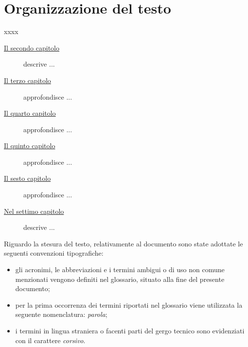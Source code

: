 \section{Organizzazione del testo}
xxxx
\begin{description}

    \item[{\hyperref[cap:processi-metodologie]{Il secondo capitolo}}] descrive ...
    
    \item[{\hyperref[cap:descrizione-stage]{Il terzo capitolo}}] approfondisce ...
    
    \item[{\hyperref[cap:analisi-requisiti]{Il quarto capitolo}}] approfondisce ...
    
    \item[{\hyperref[cap:progettazione-codifica]{Il quinto capitolo}}] approfondisce ...
    
    \item[{\hyperref[cap:verifica-validazione]{Il sesto capitolo}}] approfondisce ...
    
    \item[{\hyperref[cap:conclusioni]{Nel settimo capitolo}}] descrive ...
\end{description}

Riguardo la stesura del testo, relativamente al documento sono state adottate le seguenti convenzioni tipografiche:
\begin{itemize}
	\item gli acronimi, le abbreviazioni e i termini ambigui o di uso non comune menzionati vengono definiti nel glossario, situato alla fine del presente documento;
	\item per la prima occorrenza dei termini riportati nel glossario viene utilizzata la seguente nomenclatura: \emph{parola}\glsfirstoccur;
	\item i termini in lingua straniera o facenti parti del gergo tecnico sono evidenziati con il carattere \emph{corsivo}.
\end{itemize}